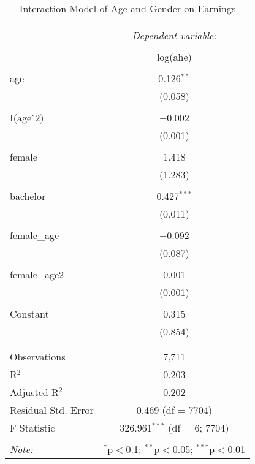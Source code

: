 
\begin{table}[!htbp] \centering 
  \caption{Interaction Model of Age and Gender on Earnings} 
  \label{} 
\begin{tabular}{@{\extracolsep{5pt}}lc} 
\\[-1.8ex]\hline 
\hline \\[-1.8ex] 
 & \multicolumn{1}{c}{\textit{Dependent variable:}} \\ 
\cline{2-2} 
\\[-1.8ex] & log(ahe) \\ 
\hline \\[-1.8ex] 
 age & 0.126$^{**}$ \\ 
  & (0.058) \\ 
  & \\ 
 I(age$\hat{\mkern6mu}$2) & $-$0.002 \\ 
  & (0.001) \\ 
  & \\ 
 female & 1.418 \\ 
  & (1.283) \\ 
  & \\ 
 bachelor & 0.427$^{***}$ \\ 
  & (0.011) \\ 
  & \\ 
 female\_age & $-$0.092 \\ 
  & (0.087) \\ 
  & \\ 
 female\_age2 & 0.001 \\ 
  & (0.001) \\ 
  & \\ 
 Constant & 0.315 \\ 
  & (0.854) \\ 
  & \\ 
\hline \\[-1.8ex] 
Observations & 7,711 \\ 
R$^{2}$ & 0.203 \\ 
Adjusted R$^{2}$ & 0.202 \\ 
Residual Std. Error & 0.469 (df = 7704) \\ 
F Statistic & 326.961$^{***}$ (df = 6; 7704) \\ 
\hline 
\hline \\[-1.8ex] 
\textit{Note:}  & \multicolumn{1}{r}{$^{*}$p$<$0.1; $^{**}$p$<$0.05; $^{***}$p$<$0.01} \\ 
\end{tabular} 
\end{table} 
